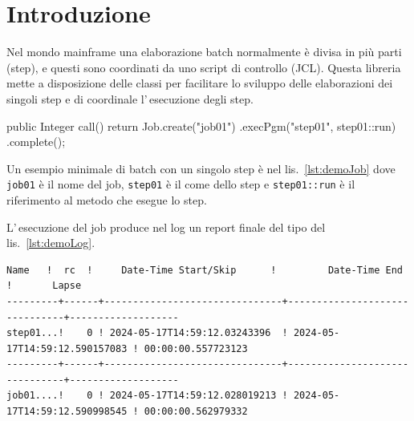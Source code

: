 \section*{Introduzione}
Nel mondo mainframe una elaborazione batch normalmente è divisa in più parti
(step), e questi sono coordinati da uno script di controllo (JCL).
Questa libreria mette a disposizione delle classi per facilitare lo sviluppo
delle elaborazioni dei singoli step e di coordinale l'\,esecuzione degli step.

\begin{elisting}[!htb]
\begin{javacode}
public Integer call() {
    return Job.create("job01")
        .execPgm("step01", step01::run)
        .complete();
}
\end{javacode}
\caption{esempio minimale job}
\label{lst:demoJob}
\end{elisting}
Un esempio minimale di batch con un singolo step è nel lis.~\ref{lst:demoJob}
dove \texttt{job01} è il nome del job, \texttt{step01} è il come dello step e
\texttt{step01::run} è il riferimento al metodo che esegue lo step.

L'\,esecuzione del job produce nel log un report finale del tipo del
lis.~\ref{lst:demoLog}.
\begin{elisting}[!htb]
\begin{Verbatim}[fontsize=\small,frame=single]
  Name   !  rc  !     Date-Time Start/Skip      !         Date-Time End         !       Lapse
---------+------+-------------------------------+-------------------------------+-------------------
step01...!    0 ! 2024-05-17T14:59:12.03243396  ! 2024-05-17T14:59:12.590157083 ! 00:00:00.557723123
---------+------+-------------------------------+-------------------------------+-------------------
job01....!    0 ! 2024-05-17T14:59:12.028019213 ! 2024-05-17T14:59:12.590998545 ! 00:00:00.562979332
\end{Verbatim}
\caption{esempio report fine esecuzione job}
\label{lst:demoLog}
\end{elisting}

